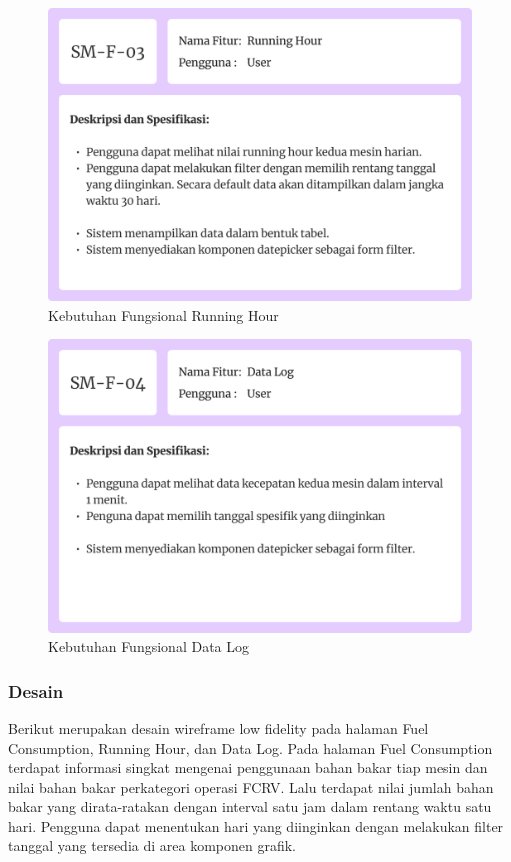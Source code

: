 \begin{figure}[!h]
    \includegraphics[width=.8\linewidth, center]{images/hasil/iterations/2/fr-rh.png}
    \caption{Kebutuhan Fungsional Running Hour}
    \label{fig:fr-rh}
\end{figure}

\newpage

\begin{figure}[!h]
    \includegraphics[width=.8\linewidth, center]{images/hasil/iterations/2/fr-dl.png}
    \caption{Kebutuhan Fungsional Data Log}
    \label{fig:fr-dl}
\end{figure}

\newpage

\subsubsection{Desain}

Berikut merupakan desain wireframe low fidelity pada halaman Fuel Consumption, Running Hour, dan Data Log. Pada halaman Fuel Consumption terdapat informasi singkat mengenai penggunaan bahan bakar tiap mesin dan nilai bahan bakar perkategori operasi FCRV. Lalu terdapat nilai jumlah bahan bakar yang dirata-ratakan dengan interval satu jam dalam rentang waktu satu hari. Pengguna dapat menentukan hari yang diinginkan dengan melakukan filter tanggal yang tersedia di area komponen grafik.

